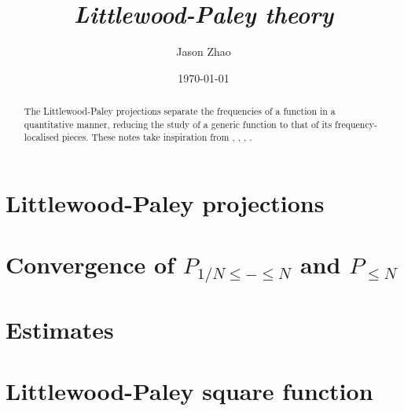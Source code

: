\documentclass[reqno]{amsart}
\title
{
	\emph{Littlewood-Paley theory}
}
\author{Jason Zhao}
\date{\today}
\begin{document}
\maketitle

\begin{abstract}
	The Littlewood-Paley projections separate the frequencies of a function in a quantitative manner, reducing the study of a generic function to that of its frequency-localised pieces. These notes take inspiration from \cite{Tao2006}, \cite{BahouriEtAl2011}, \cite{Stein16}, \cite{Grafakos2014a}. 
\end{abstract}

\tableofcontents

\section{Littlewood-Paley projections}


\section{Convergence of $P_{1/N \leq - \leq N}$ and $P_{\leq N}$}


\section{Estimates}


\section{Littlewood-Paley square function}




\end{document}
